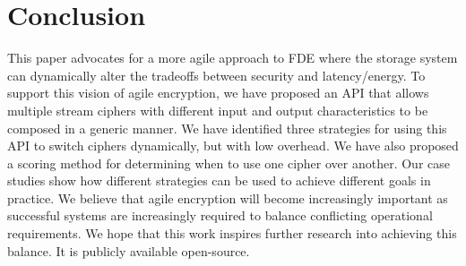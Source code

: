 \section{Conclusion}\label{sec:conclusion}
This paper advocates for a more agile approach to FDE where the storage system
can dynamically alter the tradeoffs between security and latency/energy. To
support this vision of agile encryption, we have proposed an API that allows
multiple stream ciphers with different input and output characteristics to be
composed in a generic manner. We have identified three strategies for using this
API to switch ciphers dynamically, but with low overhead. We have also proposed
a scoring method for determining when to use one cipher over another. Our case
studies show how different strategies can be used to achieve different goals in
practice. We believe that agile encryption will become increasingly important as
successful systems are increasingly required to balance conflicting operational
requirements. We hope that this work inspires further research into achieving
this balance. It is publicly available open-source.

